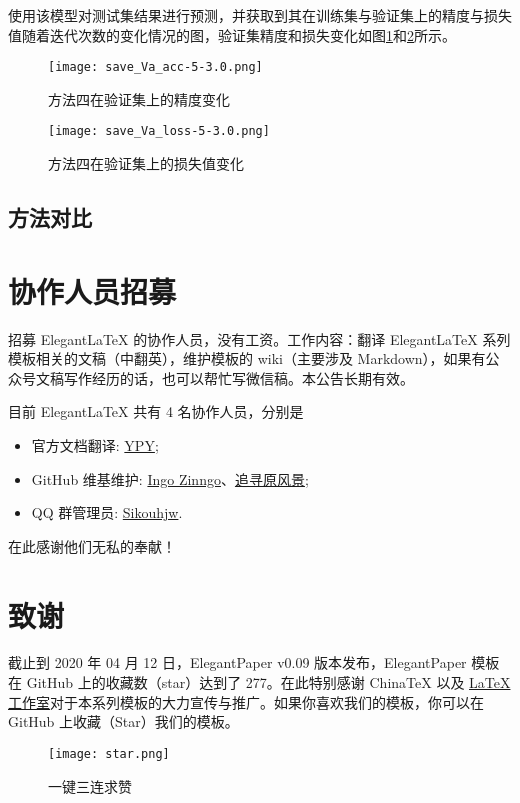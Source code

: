 \documentclass[lang=cn,11pt,a4paper,cite=authoryear]{elegantpaper}
\begin{document}
使用该模型对测试集结果进行预测，并获取到其在训练集与验证集上的精度与损失值随着迭代次数的变化情况的图，验证集精度和损失变化如图\ref{fig:val-acc4}和\ref{fig:val-loss4}所示。

\begin{figure}[!htb]
  \centering
  \texttt{[image: save\_Va\_acc-5-3.0.png]}
  \caption{方法四在验证集上的精度变化}
  \label{fig:val-acc4}
\end{figure}

\begin{figure}[!htb]
  \centering
  \texttt{[image: save\_Va\_loss-5-3.0.png]}
  \caption{方法四在验证集上的损失值变化}
  \label{fig:val-loss4}
\end{figure}


\subsection{方法对比}




\section{协作人员招募}
招募 Elegant\LaTeX{} 的协作人员，没有工资。工作内容：翻译 Elegant\LaTeX{} 系列模板相关的文稿（中翻英），维护模板的 wiki（主要涉及 Markdown），如果有公众号文稿写作经历的话，也可以帮忙写微信稿。本公告长期有效。

目前 ElegantLaTeX 共有 4 名协作人员，分别是
\begin{itemize}
  \item 官方文档翻译: \href{https://github.com/peggy2006xzyz}{YPY};
  \item GitHub 维基维护: \href{https://github.com/izinngo}{Ingo Zinngo}、\href{https://github.com/xiaohao890809}{追寻原风景};
  \item QQ 群管理员: \href{https://github.com/sikouhjw}{Sikouhjw}.
\end{itemize}

在此感谢他们无私的奉献！


\section{致谢}
截止到 2020 年 04 月 12 日，ElegantPaper v0.09 版本发布，ElegantPaper 模板在 GitHub 上的收藏数（star）达到了 277。在此特别感谢 China\TeX{} 以及 \href{http://www.latexstudio.net/}{\LaTeX{} 工作室}对于本系列模板的大力宣传与推广。如果你喜欢我们的模板，你可以在 GitHub 上收藏（Star）我们的模板。
\begin{figure}[htbp]
  \centering
  \texttt{[image: star.png]}
  \caption{一键三连求赞}
\end{figure}
\end{document}

